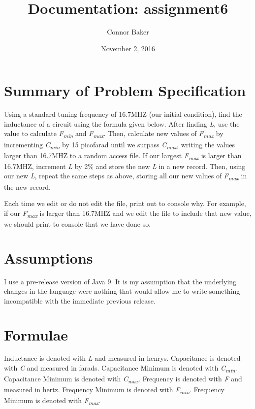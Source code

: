 \documentclass[12pt]{article}
\begin{document}
\null  %
\nointerlineskip  %
\vfill
\let \snewpage \newpage
\let \newpage \relax
    \title{Documentation: assignment6}
    \author{Connor Baker}
    \date{November 2, 2016}
\maketitle
\let \newpage \snewpage
\vfill

\newpage %



\section*{Summary of Problem Specification}
Using a standard tuning frequency of 16.7MHZ (our initial condition), find the inductance of a circuit using the formula given below. After finding \textit{L}, use the value to calculate \textit{F\textsubscript{min}} and \textit{F\textsubscript{max}}. Then, calculate new values of \textit{F\textsubscript{max}} by incrementing \textit{C\textsubscript{min}} by 15 picofarad until we surpass \textit{C\textsubscript{max}}, writing the values larger than 16.7MHZ to a random access file. If our largest \textit{F\textsubscript{max}} is larger than 16.7MHZ, increment \textit{L} by 2\% and store the new \textit{L} in a new record. Then, using our new \textit{L}, repeat the same steps as above, storing all our new values of \textit{F\textsubscript{max}} in the new record.

\par %
Each time we edit or do not edit the file, print out to console why. For example, if our \textit{F\textsubscript{max}} is larger than 16.7MHZ and we edit the file to include that new value, we should print to console that we have done so.


\section*{Assumptions}
I use a pre-release version of Java 9. It is my assumption that the underlying changes in the language were nothing that would allow me to write something incompatible with the immediate previous release.


\section*{Formulae}
Inductance is denoted with \textit{L} and measured in henrys.
Capacitance is denoted with \textit{C} and measured in farads.
Capacitance Minimum is denoted with \textit{C\textsubscript{min}}.
Capacitance Minimum is denoted with \textit{C\textsubscript{max}}.
Frequency is denoted with \textit{F} and measured in hertz.
Frequency Minimum is denoted with \textit{F\textsubscript{min}}.
Frequency Minimum is denoted with \textit{F\textsubscript{max}}.
\end{document}
